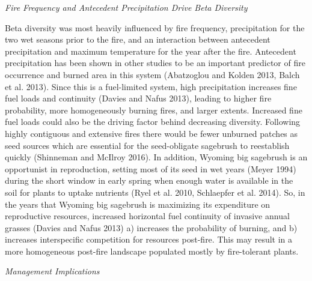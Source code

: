 \documentclass[12pt,]{article}
\begin{document}
\emph{Fire Frequency and Antecedent Precipitation Drive Beta Diversity}

Beta diversity was most heavily influenced by fire frequency,
precipitation for the two wet seasons prior to the fire, and an
interaction between antecedent precipitation and maximum temperature for
the year after the fire. Antecedent precipitation has been shown in
other studies to be an important predictor of fire occurrence and burned
area in this system (Abatzoglou and Kolden 2013, Balch et al. 2013).
Since this is a fuel-limited system, high precipitation increases fine
fuel loads and continuity (Davies and Nafus 2013), leading to higher
fire probability, more homogeneously burning fires, and larger extents.
Increased fine fuel loads could also be the driving factor behind
decreasing diversity. Following highly contiguous and extensive fires
there would be fewer unburned patches as seed sources which are
essential for the seed-obligate sagebrush to reestablish quickly
(Shinneman and McIlroy 2016). In addition, Wyoming big sagebrush is an
opportunist in reproduction, setting most of its seed in wet years
(Meyer 1994) during the short window in early spring when enough water
is available in the soil for plants to uptake nutrients (Ryel et al.
2010, Schlaepfer et al. 2014). So, in the years that Wyoming big
sagebrush is maximizing its expenditure on reproductive resources,
increased horizontal fuel continuity of invasive annual grasses (Davies
and Nafus 2013) a) increases the probability of burning, and b)
increases interspecific competition for resources post-fire. This may
result in a more homogeneous post-fire landscape populated mostly by
fire-tolerant plants.

\emph{Management Implications}
\end{document}

